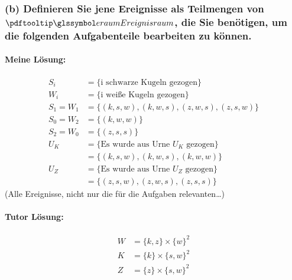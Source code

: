 \begin{auf}
    \subsubsection*{(b) Definieren Sie jene Ereignisse als Teilmengen von $\eraum$, die Sie benötigen, um die folgenden
    Aufgabenteile bearbeiten zu können.}
    \paragraph{Meine Lösung:}
    \begin{align*}
        S_i & = \{\text{i schwarze Kugeln gezogen}\} \\
        W_i  & = \{\text{i weiße Kugeln gezogen}\} \\
        S_1 = W_1 & = \{(k,s,w), (k,w,s), (z,w,s), (z,s,w)\} \\
        S_0 = W_2 &  = \{(k,w,w)\} \\
        S_2  = W_0 &  = \{(z,s,s)\} \\
        U_K & = \{\text{Es wurde aus Urne $U_K$ gezogen}\} \\
        & = \{(k,s,w), (k,w,s), (k,w,w)\}  \\
        U_Z & = \{\text{Es wurde aus Urne $U_Z$ gezogen}\} \\
        & = \{(z,s,w), (z,w,s), (z,s,s)\}
    \end{align*}
    (Alle Ereignisse, nicht nur die für die Aufgaben relevanten\ldots)
    \paragraph{Tutor Lösung:}
    \begin{align*}
    W &= \{k,z\} \times \{w\}^2 \\
    K &= \{k\} \times \{s,w\}^2 \\
    Z &= \{z\} \times \{s,w\}^2
    \end{align*}
\end{auf}

